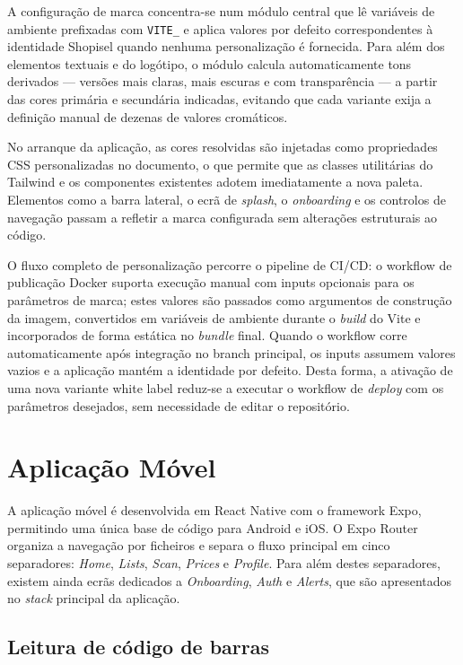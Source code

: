 A configuração de marca concentra-se num módulo central que lê variáveis de ambiente prefixadas com \texttt{VITE\_} e aplica valores por defeito correspondentes à identidade Shopisel quando nenhuma personalização é fornecida. Para além dos elementos textuais e do logótipo, o módulo calcula automaticamente tons derivados — versões mais claras, mais escuras e com transparência — a partir das cores primária e secundária indicadas, evitando que cada variante exija a definição manual de dezenas de valores cromáticos.

No arranque da aplicação, as cores resolvidas são injetadas como propriedades CSS personalizadas no documento, o que permite que as classes utilitárias do Tailwind e os componentes existentes adotem imediatamente a nova paleta. Elementos como a barra lateral, o ecrã de \textit{splash}, o \textit{onboarding} e os controlos de navegação passam a refletir a marca configurada sem alterações estruturais ao código.

O fluxo completo de personalização percorre o pipeline de \ac{CI/CD}: o workflow de publicação Docker suporta execução manual com inputs opcionais para os parâmetros de marca; estes valores são passados como argumentos de construção da imagem, convertidos em variáveis de ambiente durante o \textit{build} do Vite e incorporados de forma estática no \textit{bundle} final. Quando o workflow corre automaticamente após integração no branch principal, os inputs assumem valores vazios e a aplicação mantém a identidade por defeito. Desta forma, a ativação de uma nova variante white label reduz-se a executar o workflow de \textit{deploy} com os parâmetros desejados, sem necessidade de editar o repositório.

\section{Aplicação Móvel}
\label{sec:4.6}

A aplicação móvel é desenvolvida em React Native com o framework Expo, permitindo uma única base de código para Android e iOS. O Expo Router organiza a navegação por ficheiros e separa o fluxo principal em cinco separadores: \textit{Home}, \textit{Lists}, \textit{Scan}, \textit{Prices} e \textit{Profile}. Para além destes separadores, existem ainda ecrãs dedicados a \textit{Onboarding}, \textit{Auth} e \textit{Alerts}, que são apresentados no \textit{stack} principal da aplicação.

\subsection{Leitura de código de barras}
\label{sec:4.6.1}

